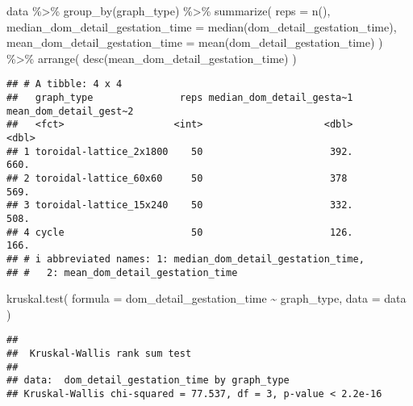 \documentclass[
]{book}
\newenvironment{Shaded}{\begin{snugshade}}{\end{snugshade}}
\newcommand{\AttributeTok}[1]{\textcolor[rgb]{0.77,0.63,0.00}{#1}}
\newcommand{\FunctionTok}[1]{\textcolor[rgb]{0.00,0.00,0.00}{#1}}
\newcommand{\NormalTok}[1]{#1}
\newcommand{\SpecialCharTok}[1]{\textcolor[rgb]{0.00,0.00,0.00}{#1}}
\begin{document}
\begin{Shaded}
\begin{Highlighting}[]
\NormalTok{data }\SpecialCharTok{\%\textgreater{}\%}
  \FunctionTok{group\_by}\NormalTok{(graph\_type) }\SpecialCharTok{\%\textgreater{}\%}
  \FunctionTok{summarize}\NormalTok{(}
    \AttributeTok{reps =} \FunctionTok{n}\NormalTok{(),}
    \AttributeTok{median\_dom\_detail\_gestation\_time =} \FunctionTok{median}\NormalTok{(dom\_detail\_gestation\_time),}
    \AttributeTok{mean\_dom\_detail\_gestation\_time =} \FunctionTok{mean}\NormalTok{(dom\_detail\_gestation\_time)}
\NormalTok{  ) }\SpecialCharTok{\%\textgreater{}\%}
  \FunctionTok{arrange}\NormalTok{(}
    \FunctionTok{desc}\NormalTok{(mean\_dom\_detail\_gestation\_time)}
\NormalTok{  )}
\end{Highlighting}
\end{Shaded}

\begin{verbatim}
## # A tibble: 4 x 4
##   graph_type               reps median_dom_detail_gesta~1 mean_dom_detail_gest~2
##   <fct>                   <int>                     <dbl>                  <dbl>
## 1 toroidal-lattice_2x1800    50                      392.                   660.
## 2 toroidal-lattice_60x60     50                      378                    569.
## 3 toroidal-lattice_15x240    50                      332.                   508.
## 4 cycle                      50                      126.                   166.
## # i abbreviated names: 1: median_dom_detail_gestation_time,
## #   2: mean_dom_detail_gestation_time
\end{verbatim}

\begin{Shaded}
\begin{Highlighting}[]
\FunctionTok{kruskal.test}\NormalTok{(}
  \AttributeTok{formula =}\NormalTok{ dom\_detail\_gestation\_time }\SpecialCharTok{\textasciitilde{}}\NormalTok{ graph\_type,}
  \AttributeTok{data =}\NormalTok{ data}
\NormalTok{)}
\end{Highlighting}
\end{Shaded}

\begin{verbatim}
## 
##  Kruskal-Wallis rank sum test
## 
## data:  dom_detail_gestation_time by graph_type
## Kruskal-Wallis chi-squared = 77.537, df = 3, p-value < 2.2e-16
\end{verbatim}
\end{document}
